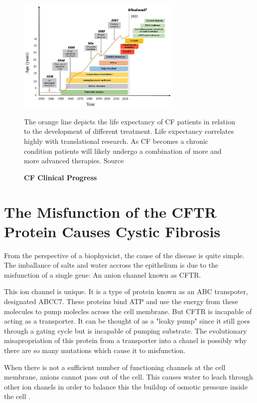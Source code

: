 \begin{figure}
	\label{CF_life_expectancy}
	\begin{center}
	\includegraphics[width=0.7\textwidth]{figures/CF_life_expectancy.png}
	\end{center}
	\captionsetup{singlelinecheck = false, justification=raggedright}
	\caption[CF Clinical Progress] {\textbf{CF Clinical Progress}}{The orange line depicts the life expectancy of CF patients in relation to the development of different treatment.  Life expectancy correlates highly with translational research. As CF becomes a chronic condition patients will likely undergo a combination of more and more advanced therapies. Source \cite{garcia2022}} 
\end{figure}


\section{The Misfunction of the CFTR Protein Causes Cystic Fibrosis}

From the perspective of a biophysicist, the cause of the disease is quite simple. The imballance of salts and water accross the epithelium is due to the misfunction of a single gene: An anion channel known as CFTR.

This ion channel is unique. It is a type of protein known as an ABC transpoter, designated ABCC7. These proteins bind ATP and use the energy from these molecules to pump molecles across the cell membrane. But CFTR is incapable of acting as a transporter. It can be thought of as a "leaky pump" since it still goes through a gating cycle but is incapable of pumping substrate\cite{linsdell2018}. The evolutionary misapropriation of this protein from a transporter into a chanel is possibly why there are so many mutations which cause it to misfunction. 

When there is not a sufficient number of functioning channels at the cell membrane, anions cannot pass out of the cell. This causes water to leach through other ion chanels in order to balance this the buildup of osmotic pressure inside the cell \cite{verkman2003}.

